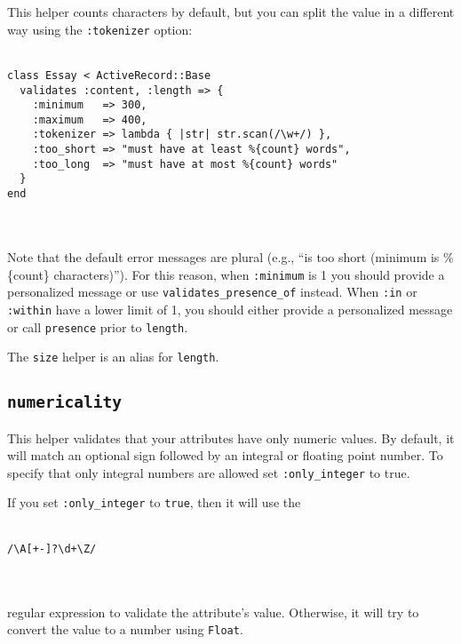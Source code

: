 \documentclass[10pt]{book}
\begin{document}
This helper counts characters by default, but you can split the value in a different way using the \texttt{:tokenizer} option:
\\ \\
\begin{minipage}{\textwidth}{\scriptsize
\begin{verbatim}
class Essay < ActiveRecord::Base
  validates :content, :length => {
    :minimum   => 300,
    :maximum   => 400,
    :tokenizer => lambda { |str| str.scan(/\w+/) },
    :too_short => "must have at least %{count} words",
    :too_long  => "must have at most %{count} words"
  }
end
\end{verbatim}}
\end{minipage}
\\ \\

Note that the default error messages are plural (e.g., “is too short (minimum is \%\{count\} characters)”). For this reason, when \texttt{:minimum} is 1 you should provide a personalized message or use \texttt{validates\_presence\_of} instead. When \texttt{:in} or \texttt{:within} have a lower limit of 1, you should either provide a personalized message or call \texttt{presence} prior to \texttt{length}.

The \texttt{size} helper is an alias for \texttt{length}.

\subsection{ \texttt{numericality}}

This helper validates that your attributes have only numeric values.  By default, it will match an optional sign followed by an integral or  floating point number. To specify that only integral numbers are allowed  set \texttt{:only\_integer} to true.

If you set \texttt{:only\_integer} to \texttt{true}, then it will use the
\\ \\
\begin{minipage}{\textwidth}{\scriptsize
\begin{verbatim}
/\A[+-]?\d+\Z/
\end{verbatim}}
\end{minipage}
\\ \\

regular expression to validate the attribute’s value. Otherwise, it will try to convert the value to a number using \texttt{Float}.
\end{document}
